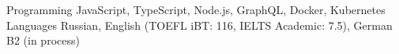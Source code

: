 \begin{cvskills}
	\cvskill
		{Programming}
		{JavaScript, TypeScript, Node.js, GraphQL, Docker, Kubernetes}
	\cvskill
		{Languages}
		{Russian, English (TOEFL iBT: 116, IELTS Academic: 7.5), German B2 (in process)}
\end{cvskills}
